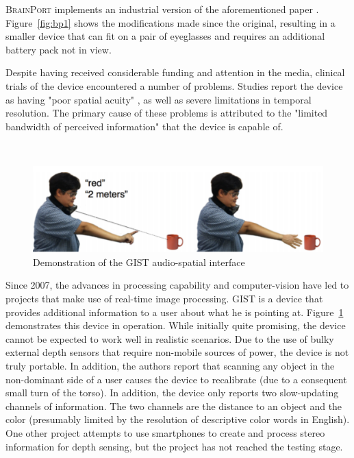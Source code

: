 \documentclass[
hidelinks,
12pt, %
oneside, %
english, %
doublespacing, %
headsepline, %
]{MastersDoctoralThesis} %
\begin{document}
\textsc{BrainPort} \parencite{upson_tongue_2007} implements an industrial version of the aforementioned paper \parencite{bach-y-rita_seeing_nodate}. Figure~\ref{fig:bp1} shows the modifications made since the original, resulting in a smaller device that can fit on a pair of eyeglasses and requires an additional battery pack not in view.

Despite having received considerable funding and attention in the media, clinical trials of the device \parencite{nau_acquisition_2015} encountered a number of problems. Studies report the device as having "poor spatial acuity" \parencite{stronks_visual_2016}, as well as severe limitations in temporal resolution. The primary cause of these problems is attributed to the "limited bandwidth of perceived information" that the device is capable of.

\,

\begin{figure}[ht]
\centering
\includegraphics[width=0.7\linewidth]{images/GIST.png}
\decoRule
\caption[GIST Interface]{Demonstration of the GIST audio-spatial interface}
\label{fig:gist}
\end{figure}

Since 2007, the advances in processing capability and computer-vision have led to projects that make use of real-time image processing. \textsc{GIST} \citep{khambadkar_gist:_2013} is a device that provides additional information to a user about what he is pointing at. Figure~\ref{fig:gist} demonstrates this device in operation. While initially quite promising, the device cannot be expected to work well in realistic scenarios. Due to the use of bulky external depth sensors that require non-mobile sources of power, the device is not truly portable. In addition, the authors report that scanning any object in the non-dominant side of a user causes the device to recalibrate (due to a consequent small turn of the torso). In addition, the device only reports two slow-updating channels of information. The two channels are the distance to an object and the color (presumably limited by the resolution of descriptive color words in English). One other project \parencite{akhter_smartphone-based_2011} attempts to use smartphones to create and process stereo information for depth sensing, but the project has not reached the testing stage.
\end{document}
